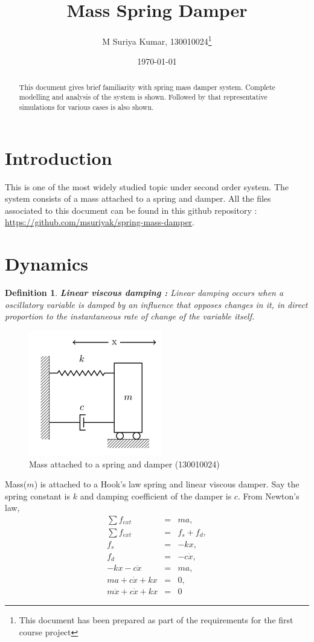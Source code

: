 \documentclass[11pt]{article}
\title{Mass Spring Damper}
\author{M Suriya Kumar, 130010024\thanks{This document has been prepared as part of the requirements for the first course project}}
\date{\today}
\newtheorem*{defn}{Definition}
\begin{document}
\maketitle
\begin{abstract}
This document gives brief familiarity with spring mass damper system. Complete modelling and analysis of 
the system is shown. Followed by that representative simulations for various cases is also shown.
\end{abstract}
\section{Introduction}
This is one of the most widely studied topic under second order system. The system consists of a mass attached to a spring and damper. All the files
associated to this document can be found in this github repository : \url{https://github.com/msuriyak/spring-mass-damper}.

\section{Dynamics}
\begin{defn}
\hfill \break
\textbf{Linear viscous damping \cite{wiki} :} Linear damping occurs when a oscillatory variable is damped 
by an influence that opposes changes in it, in direct proportion to the instantaneous rate of change 
of the variable itself.
\end{defn}

\begin{figure}[H]
	\begin{center}
	\includegraphics[scale=0.8]{spring_mass_damper.png}
	\caption{Mass attached to a spring and damper (130010024)}
	\centering
	\end{center}
\end{figure}

Mass($m$) is attached to a Hook's law spring and linear viscous damper. Say the spring constant 
is $k$ and damping coefficient of the damper is $c$.
\hfil \break
From Newton's law, 
\begin{eqnarray*}
\sum f_{ext} &=& ma, \\
\sum f_{ext} &=& f_s + f_d, \\
f_s &=& -kx, 	\\
f_d &=& -c\dot{x}, \\
-kx - c\dot{x} &=& ma, \\
ma + c\dot{x} + kx &=& 0, \\
m\ddot{x} + c\dot{x} + kx &=& 0
\end{eqnarray*}
\end{document}
